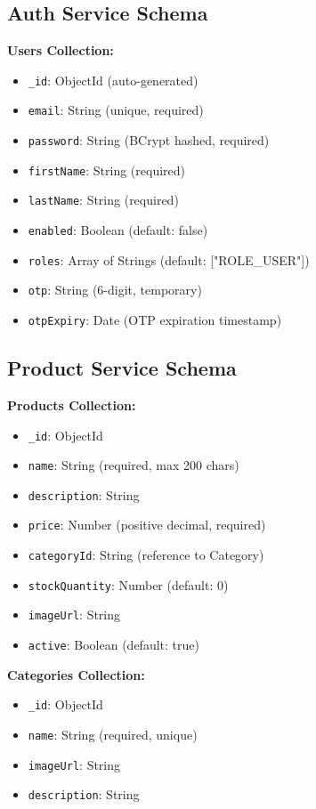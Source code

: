 \subsection{Auth Service Schema}

\textbf{Users Collection:}
\begin{itemize}
    \item \texttt{\_id}: ObjectId (auto-generated)
    \item \texttt{email}: String (unique, required)
    \item \texttt{password}: String (BCrypt hashed, required)
    \item \texttt{firstName}: String (required)
    \item \texttt{lastName}: String (required)
    \item \texttt{enabled}: Boolean (default: false)
    \item \texttt{roles}: Array of Strings (default: ["ROLE\_USER"])
    \item \texttt{otp}: String (6-digit, temporary)
    \item \texttt{otpExpiry}: Date (OTP expiration timestamp)
\end{itemize}

\subsection{Product Service Schema}

\textbf{Products Collection:}
\begin{itemize}
    \item \texttt{\_id}: ObjectId
    \item \texttt{name}: String (required, max 200 chars)
    \item \texttt{description}: String
    \item \texttt{price}: Number (positive decimal, required)
    \item \texttt{categoryId}: String (reference to Category)
    \item \texttt{stockQuantity}: Number (default: 0)
    \item \texttt{imageUrl}: String
    \item \texttt{active}: Boolean (default: true)
\end{itemize}

\textbf{Categories Collection:}
\begin{itemize}
    \item \texttt{\_id}: ObjectId
    \item \texttt{name}: String (required, unique)
    \item \texttt{imageUrl}: String
    \item \texttt{description}: String
\end{itemize}

